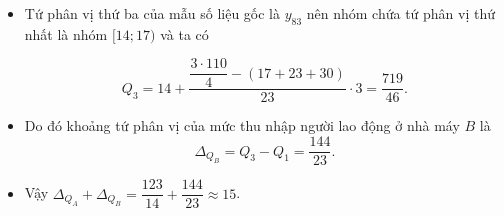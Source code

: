 \begin{ex}
{\begin{itemize}
	$$ Q_1=8+\dfrac{\dfrac{110}{4}-17}{23}\cdot 3=\dfrac{431}{46}.$$
	
	\item	Tứ phân vị thứ ba của mẫu số liệu gốc là $y_{83}$ nên nhóm chứa tứ phân vị thứ nhất là nhóm $[14; 17)$ và ta có
	
	$$
	Q_3=14+\dfrac{\dfrac{3\cdot 110}{4}-(17+23+30)}{23} \cdot 3=\dfrac{719}{46}.
	$$
	
	\item Do đó khoảng tứ phân vị của mức thu nhập người lao động ở nhà máy $B$ là $$\Delta_{Q_B}=Q_3-Q_1=\dfrac{144}{23}.$$
	
	\item	Vậy $\Delta_{Q_A}+\Delta_{Q_B}=\dfrac{123}{14}+\dfrac{144}{23} \approx 15$.
	\end{itemize}
	}
\end{ex}

